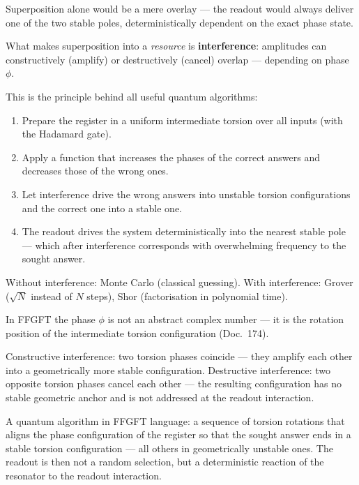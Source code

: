 Superposition alone would be a mere overlay ---
the readout would always deliver one of the two stable poles,
deterministically dependent on the exact phase state.

What makes superposition into a \emph{resource} is
\textbf{interference}: amplitudes can
constructively (amplify) or destructively (cancel)
overlap --- depending on phase $\phi$.

This is the principle behind all useful
quantum algorithms:
\begin{enumerate}
  \item Prepare the register in a
    uniform intermediate torsion over all inputs
    (with the Hadamard gate).
  \item Apply a function that increases the phases
    of the correct answers and decreases those
    of the wrong ones.
  \item Let interference drive the wrong answers
    into unstable torsion configurations
    and the correct one into a stable one.
  \item The readout drives the system deterministically
    into the nearest stable pole ---
    which after interference corresponds
    with overwhelming frequency to the sought answer.
\end{enumerate}

Without interference: Monte Carlo (classical guessing).
With interference: Grover ($\sqrt{N}$ instead of $N$ steps),
Shor (factorisation in polynomial time).

\begin{foundation}
In FFGFT the phase $\phi$ is not an abstract
complex number --- it is the rotation position
of the intermediate torsion configuration (Doc.~174).

Constructive interference: two torsion phases
coincide --- they amplify each other into a
geometrically more stable configuration.
Destructive interference: two opposite
torsion phases cancel each other ---
the resulting configuration has no
stable geometric anchor and is not addressed at
the readout interaction.

A quantum algorithm in FFGFT language:
a sequence of torsion rotations that aligns the
phase configuration of the register so that
the sought answer ends in a stable
torsion configuration --- all others
in geometrically unstable ones.
The readout is then not a random selection,
but a deterministic reaction of the
resonator to the readout interaction.
\end{foundation}


